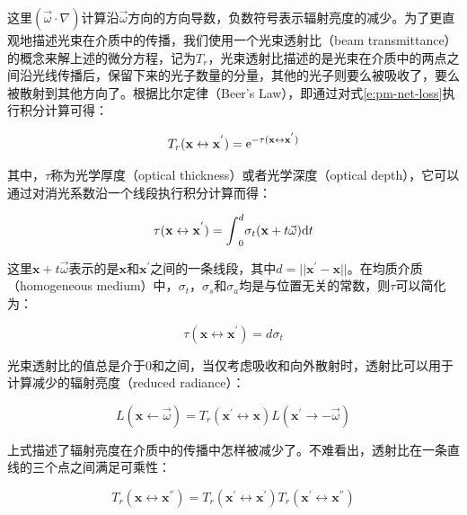 \noindent 这里$(\vec{\omega}\cdot\nabla)$计算沿$\vec{\omega}$方向的方向导数，负数符号表示辐射亮度的减少。为了更直观地描述光束在介质中的传播，我们使用一个光束透射比（beam transmittance）的概念来解上述的微分方程，记为$T_r$，光束透射比描述的是光束在介质中的两点之间沿光线传播后，保留下来的光子数量的分量，其他的光子则要么被吸收了，要么被散射到其他方向了。根据比尔定律（Beer’s Law），即通过对式\ref{e:pm-net-loss}执行积分计算可得：

\begin{equation}\label{e:pm-transmittance}
	T_r(\mathbf{x}\leftrightarrow\mathbf{x}^{'})={\rm e}^{-\tau(\mathbf{x}\leftrightarrow\mathbf{x}^{'})}
\end{equation}

\noindent 其中，$\tau$称为光学厚度（optical thickness）或者光学深度（optical depth），它可以通过对消光系数沿一个线段执行积分计算而得：

\begin{equation}
	\tau(\mathbf{x}\leftrightarrow\mathbf{x}^{'})={\rm \int}^{d}_{0}\sigma_t(\mathbf{x}+t\vec{\omega}){\rm d}t
\end{equation}

\noindent 这里$\mathbf{x}+t\vec{\omega}$表示的是$\mathbf{x}$和$\mathbf{x}^{'}$之间的一条线段，其中$d=||\mathbf{x}^{'}-\mathbf{x}||$。在均质介质（homogeneous medium）中，$\sigma_t$，$\sigma_s$和$\sigma_a$均是与位置无关的常数，则$\tau$可以简化为：

\begin{equation}
	\tau(\mathbf{x}\leftrightarrow\mathbf{x}^{'})=d\sigma_t
\end{equation}

光束透射比的值总是介于0和之间，当仅考虑吸收和向外散射时，透射比可以用于计算减少的辐射亮度（reduced radiance）：

\begin{equation}
	L(\mathbf{x}\leftarrow\vec{\omega})=T_r(\mathbf{x}^{'}\leftrightarrow\mathbf{x})L(\mathbf{x}^{'}\to-\vec{\omega})
\end{equation}

\noindent 上式描述了辐射亮度在介质中的传播中怎样被减少了。不难看出，透射比在一条直线的三个点之间满足可乘性：

\begin{equation}
	T_r(\mathbf{x}\leftrightarrow\mathbf{x}^{''})=T_r(\mathbf{x}^{'}\leftrightarrow\mathbf{x}^{'})T_r(\mathbf{x}^{'}\leftrightarrow\mathbf{x}^{''})
\end{equation}

